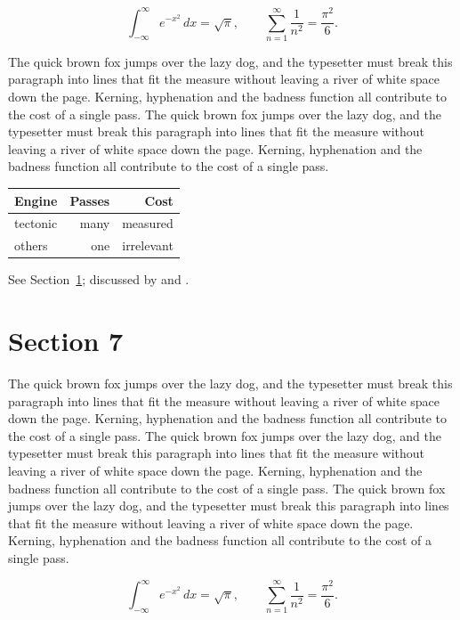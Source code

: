 \documentclass{article}
\begin{document}
\begin{equation}\label{eq:6}
\int_{-\infty}^{\infty} e^{-x^{2}}\,dx = \sqrt{\pi}, \qquad
\sum_{n=1}^{\infty} \frac{1}{n^{2}} = \frac{\pi^{2}}{6}.
\end{equation}

The quick brown fox jumps over the lazy dog, and the typesetter must break this paragraph into lines that fit the measure without leaving a river of white space down the page. Kerning, hyphenation and the badness function all contribute to the cost of a single pass. The quick brown fox jumps over the lazy dog, and the typesetter must break this paragraph into lines that fit the measure without leaving a river of white space down the page. Kerning, hyphenation and the badness function all contribute to the cost of a single pass. 

\begin{center}
\begin{tabular}{lrr}
\toprule
Engine & Passes & Cost \\
\midrule
tectonic & many & measured \\
others & one & irrelevant \\
\bottomrule
\end{tabular}
\end{center}

See Section~\ref{sec:7}; discussed by \textcite{k2} and \textcite{l4}.
\section{Section 7}
\label{sec:7}
The quick brown fox jumps over the lazy dog, and the typesetter must break this paragraph into lines that fit the measure without leaving a river of white space down the page. Kerning, hyphenation and the badness function all contribute to the cost of a single pass. The quick brown fox jumps over the lazy dog, and the typesetter must break this paragraph into lines that fit the measure without leaving a river of white space down the page. Kerning, hyphenation and the badness function all contribute to the cost of a single pass. The quick brown fox jumps over the lazy dog, and the typesetter must break this paragraph into lines that fit the measure without leaving a river of white space down the page. Kerning, hyphenation and the badness function all contribute to the cost of a single pass. 

\begin{equation}\label{eq:7}
\int_{-\infty}^{\infty} e^{-x^{2}}\,dx = \sqrt{\pi}, \qquad
\sum_{n=1}^{\infty} \frac{1}{n^{2}} = \frac{\pi^{2}}{6}.
\end{equation}
\end{document}
